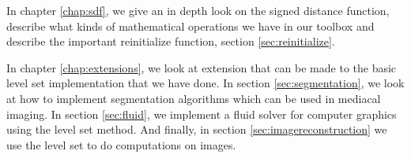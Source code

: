 In chapter \vref{chap:sdf}, we give an in depth look on the signed
distance function, describe what kinds of mathematical operations we
have in our toolbox and describe the important reinitialize function,
section \vref{sec:reinitialize}.

In chapter \vref{chap:extensions}, we look at extension that can be
made to the basic level set implementation that we have done. In
section \vref{sec:segmentation}, we look at how to implement
segmentation algorithms which can be used in mediacal imaging. In
section \vref{sec:fluid}, we implement a fluid solver for computer
graphics using the level set method. And finally, in section
\vref{sec:imagereconstruction}  we use the level set to do computations
on images.




